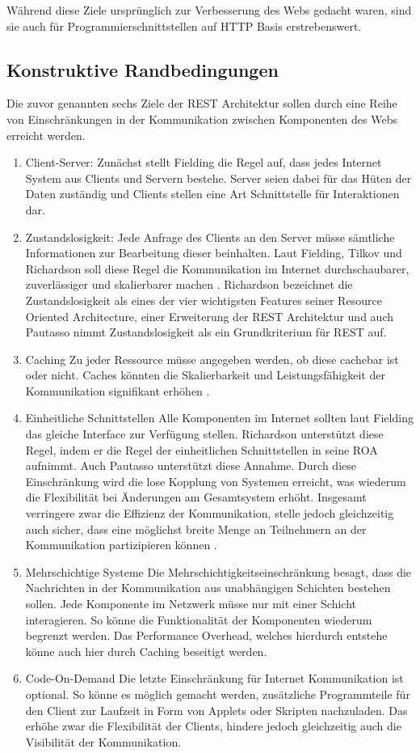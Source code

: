 Während diese Ziele ursprünglich zur Verbesserung des Webs gedacht waren, sind sie auch für Programmierschnittstellen auf HTTP Basis erstrebenswert.

\subsection{Konstruktive Randbedingungen}\label{subsection:konstruktive-randbedingungen}

Die zuvor genannten sechs Ziele der REST Architektur sollen durch eine Reihe von Einschränkungen in der Kommunikation zwischen Komponenten des Webs erreicht werden.

\begin{enumerate}
    \item Client-Server: Zunächst stellt Fielding die Regel auf, dass jedes Internet System aus Clients und Servern bestehe. Server seien dabei für das Hüten der Daten zuständig und Clients stellen eine Art Schnittstelle für Interaktionen dar.
    \item Zustandslosigkeit: Jede Anfrage des Clients an den Server müsse sämtliche Informationen zur Bearbeitung dieser beinhalten. Laut Fielding, Tilkov und Richardson soll diese Regel die Kommunikation im Internet durchschaubarer, zuverlässiger und skalierbarer machen   . Richardson bezeichnet die Zustandslosigkeit als eines der vier wichtigsten Features seiner Resource Oriented Architecture, einer Erweiterung der REST Architektur und auch Pautasso nimmt Zustandslosigkeit als ein Grundkriterium für REST auf. 
    \item Caching Zu jeder Ressource müsse angegeben werden, ob diese cachebar ist oder nicht. Caches könnten die Skalierbarkeit und Leistungsfähigkeit der Kommunikation signifikant erhöhen .
    \item Einheitliche Schnittstellen Alle Komponenten im Internet sollten laut Fielding das gleiche Interface zur Verfügung stellen. Richardson unterstützt diese Regel, indem er die Regel der einheitlichen Schnittstellen in seine ROA aufnimmt. Auch Pautasso unterstützt diese Annahme. Durch diese Einschränkung wird die lose Kopplung von Systemen erreicht, was wiederum die Flexibilität bei Änderungen am Gesamtsystem erhöht. Insgesamt verringere zwar die Effizienz der Kommunikation, stelle jedoch gleichzeitig auch sicher, dass eine möglichst breite Menge an Teilnehmern an der Kommunikation partizipieren können .
    \item Mehrschichtige Systeme Die Mehrschichtigkeitseinschränkung besagt, dass die Nachrichten in der Kommunikation aus unabhängigen Schichten bestehen sollen. Jede Komponente im Netzwerk müsse nur mit einer Schicht interagieren. So könne die Funktionalität der Komponenten wiederum begrenzt werden. Das Performance Overhead, welches hierdurch entstehe könne auch hier durch Caching beseitigt werden.
    \item Code-On-Demand Die letzte Einschränkung für Internet Kommunikation ist optional. So könne es möglich gemacht werden, zusätzliche Programmteile für den Client zur Laufzeit in Form von Applets oder Skripten nachzuladen. Das erhöhe zwar die Flexibilität der Clients, hindere jedoch gleichzeitig auch die Visibilität der Kommunikation.
\end{enumerate}

